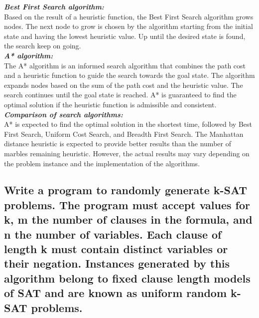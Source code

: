 \documentclass[15pt,journal]{IEEEtran}
\begin{document}
\textbf{\textit{\cite{uninformed}Best First Search algorithm:}} \\
Based on the result of a heuristic function, the Best First Search algorithm grows nodes. The next node to grow is chosen by the algorithm starting from the initial state and having the lowest heuristic value. Up until the desired state is found, the search keep on going. \\
\textbf{\textit{\cite{uninformed}A* algorithm:}} \\
The A* algorithm is an informed search algorithm that combines the path cost and a heuristic function to guide the search towards the goal state. The algorithm expands nodes based on the sum of the path cost and the heuristic value. The search continues until the goal state is reached. A* is guaranteed to find the optimal solution if the heuristic function is admissible and consistent. \\
\textbf{\textit{\cite{uninformed}Comparison of search algorithms:}} \\
 A* is expected to find the optimal solution in the shortest time, followed by Best First Search, Uniform Cost Search, and Breadth First Search. The Manhattan distance heuristic is expected to provide better results than the number of marbles remaining heuristic. However, the actual results may vary depending on the problem instance and the implementation of the algorithms.
\subsection{Write a program to randomly generate k-SAT problems.  The program must accept values for k, m the number of clauses in the formula, and n the number of variables.  Each clause of length k must contain distinct variables or their negation.  Instances generated by this algorithm belong to fixed clause length models of SAT and are known as uniform random k-SAT problems.
}
\end{document}
